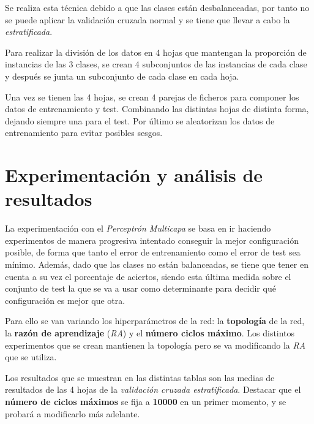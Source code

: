 \documentclass{uc3mpracticas}
\begin{document}
Se realiza esta técnica debido a que las clases están desbalanceadas, por tanto no se puede aplicar la validación cruzada normal y se tiene que llevar a cabo la \textit{estratificada}.

\vspace{2mm}

Para realizar la división de los datos en 4 hojas que mantengan la proporción de instancias de las 3 clases, se crean 4 subconjuntos de las instancias de cada clase y después se junta un subconjunto de cada clase en cada hoja.

\vspace{2mm}

Una vez se tienen las 4 hojas, se crean 4 parejas de ficheros para componer los datos de entrenamiento y test. Combinando las distintas hojas de distinta forma, dejando siempre una para el test. Por último se aleatorizan los datos de entrenamiento para evitar posibles sesgos.



\section{Experimentación y análisis de resultados}

La experimentación con el \textit{Perceptrón Multicapa} se basa en ir haciendo experimentos de manera progresiva intentado conseguir la mejor configuración posible, de forma que tanto el error de entrenamiento como el error de test sea mínimo. Además, dado que las clases no están balanceadas, se tiene que tener en cuenta a su vez el porcentaje de aciertos, siendo esta última medida sobre el conjunto de test la que se va a usar como determinante para decidir qué configuración es mejor que otra.

\vspace{2mm}

 Para ello se van variando los hiperparámetros de la red: la \textbf{topología} de la red, la \textbf{razón de aprendizaje} (\textit{RA}) y el \textbf{número ciclos máximo}. Los distintos experimentos que se crean mantienen la topología pero se va modificando la \textit{RA} que se utiliza.

\vspace{1mm}

Los resultados que se muestran en las distintas tablas son las medias de resultados de las 4 hojas de la \textit{validación cruzada estratificada}. Destacar que el \textbf{número de ciclos máximos} se fija a \textbf{10000} en un primer momento, y se probará a modificarlo más adelante.
\end{document}
